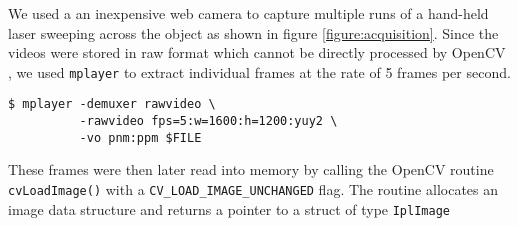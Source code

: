 We used a an inexpensive web camera to capture multiple runs of a hand-held
laser sweeping across the object as shown in figure \ref{figure:acquisition}.
Since the videos were stored in raw format which cannot be directly processed
by OpenCV \cite{bradski:2008}, we used \texttt{mplayer} to extract individual
frames at the rate of 5 frames per second.

\begin{verbatim}
$ mplayer -demuxer rawvideo \
          -rawvideo fps=5:w=1600:h=1200:yuy2 \
          -vo pnm:ppm $FILE
\end{verbatim}

These frames were then later read into memory by calling the OpenCV routine
\texttt{cvLoadImage()} with a \texttt{CV\_LOAD\_IMAGE\_UNCHANGED} flag. The
routine allocates an image data structure and returns a pointer to a struct of
type \texttt{IplImage}
